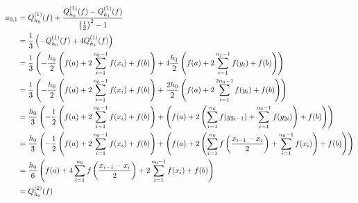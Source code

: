 \begin{align*}
    a_{0,1}
    & = Q_{h_0}^{(1)}(f) +
        \frac
        {Q_{h_0}^{(1)}(f) - Q_{h_1}^{(1)}(f)}
        {\left ( \frac{1}{2} \right )^2 - 1} \\
    & = \frac{1}{3}
        \left ( 
            - Q_{h_0}^{(1)}(f)
            + 4 Q_{h_1}^{(1)}(f)
         \right ) \\
    & = \frac{1}{3}
        \left ( 
            - \frac{h_0}{2}
            \left ( 
                f(a) +
                2 \sum_{i=1}^{n_0 - 1} f(x_i) +
                f(b)
             \right )
            + 4 \frac{h_1}{2}
            \left ( 
                f(a) +
                2 \sum_{i=1}^{n_1 - 1} f(y_i) +
                f(b)
             \right )
         \right ) \\
    & = \frac{1}{3}
        \left ( 
            - \frac{h_0}{2}
            \left ( 
                f(a) +
                2 \sum_{i=1}^{n_0 - 1} f(x_i) +
                f(b)
             \right )
            + \frac{2 h_0}{2}
            \left ( 
                f(a) +
                2 \sum_{i=1}^{2 n_0 - 1} f(y_i) +
                f(b)
             \right )
         \right ) \\
    & = \frac{h_0}{3}
        \left ( 
            - \frac{1}{2}
            \left ( 
                f(a) +
                2 \sum_{i=1}^{n_0 - 1} f(x_i) +
                f(b)
             \right )
            + \left ( 
                f(a) +
                2 \left ( 
                    \sum_{i=1}^{n_0} f(y_{2i-1}) +
                    \sum_{i=1}^{n_0-1} f(y_{2i})
                 \right ) +
                f(b)
             \right )
         \right ) \\
    & = \frac{h_0}{3}
        \left ( 
            - \frac{1}{2}
            \left ( 
                f(a) +
                2 \sum_{i=1}^{n_0 - 1} f(x_i) +
                f(b)
             \right )
            + \left ( 
                f(a) +
                2 \left ( 
                    \sum_{i=1}^{n_0}
                    f \left ( \frac{x_{i-1} - x_i}{2} \right ) +
                    \sum_{i=1}^{n_0-1} f(x_i)
                 \right ) +
                f(b)
             \right )
         \right ) \\
    & = \frac{h_0}{6}
        \left ( 
            f(a) +
            4 \sum_{i=1}^{n_0}
            f \left ( \frac{x_{i-1} - x_i}{2} \right ) +
            2 \sum_{i=1}^{n_0 - 1} f(x_i) +
            f(b)
         \right ) \\
    & = Q_{h_0}^{(2)}(f)
\end{align*}